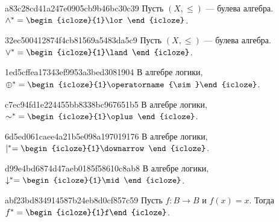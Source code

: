 \begin{note}{a83c28cd41a247e0905cb9b46bc30c39}
    Пусть \({ (X, \leqslant) }\) --- булева алгебра. \({ \land^* = \begin{icloze}{1}\lor\end{icloze} }\).
\end{note}

\begin{note}{32ec500412874f4cb81569a5483da5c9}
    Пусть \({ (X, \leqslant) }\) --- булева алгебра. \({ \lor^* = \begin{icloze}{1}\land\end{icloze} }\).
\end{note}

\begin{note}{1ed5cffea17343ef9953a3bed3081904}
    В алгебре логики, \({ \oplus^* = \begin{icloze}{1}\operatorname{\sim}\end{icloze} }\).
\end{note}

\begin{note}{c7ec94fd1e224455bb8338bc967651b5}
    В алгебре логики, \({ \operatorname{\sim}^* = \begin{icloze}{1}\oplus\end{icloze} }\).
\end{note}

\begin{note}{6d5ed061caee4a21b5e098a197019176}
    В алгебре логики, \({ \mid^* = \begin{icloze}{1}\downarrow\end{icloze} }\).
\end{note}

\begin{note}{d99e4bd6874d47aeb0185f58610c8ab8}
    В алгебре логики, \({ \downarrow^* = \begin{icloze}{1}\mid\end{icloze} }\).
\end{note}

\begin{note}{abf23bd834914587b24eb8d0cf857c59}
    Пусть \({ f : B \to B }\) и \({ f(x) = x }\).
    Тогда \({ f^* = \begin{icloze}{1}f\end{icloze} }\).
\end{note}


